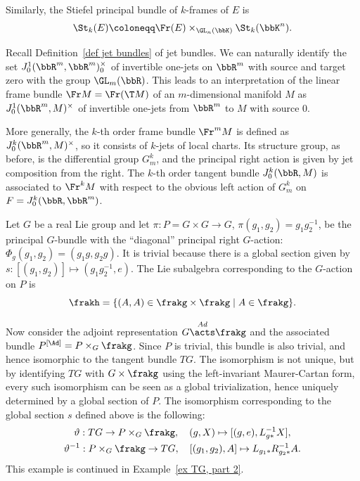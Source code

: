 \begin{example}
\begin{enumerate}
        Similarly, the Stiefel principal bundle of $k$-frames of $E$ is
        \[\St_k(E)\coloneqq \Fr(E)\times_{\GL_n(\bbK)}\St_k(\bbK^n).\]
    \end{enumerate}
\end{example}

\begin{example}
    Recall Definition~\ref{def jet bundles} of jet bundles. We can naturally identify the set $J^1_0(\bbR^m,\bbR^m)_0^\times$ of invertible one-jets on $\bbR^m$ with source and target zero with the group $\GL_m(\bbR)$. This leads to an interpretation of the linear frame bundle $\Fr M=\Fr(\T M)$ of an $m$-dimensional manifold $M$ as $J^1_0(\bbR^m,M)^\times$ of invertible one-jets from $\bbR^m$ to $M$ with source $0$.

    More generally, the $k$-th order frame bundle $\Fr^mM$ is defined as $J^k_0(\bbR^m,M)^\times$, so it consists of $k$-jets of local charts. Its structure group, as before, is the differential group $G^k_m$, and the principal right action is given by jet composition from the right. The $k$-th order tangent bundle $J^k_0(\bbR,M)$ is associated to $\Fr^k M$ with respect to the obvious left action of $G^k_m$ on $F=J^k_0(\bbR,\bbR^m)$.
\end{example}


\begin{example}\label{ex TG, part 1}
    Let $G$ be a real Lie group and let $\pi:P=G\times G\to G$, $\pi(g_1,g_2)=g_1g_2^{-1}$, be the principal $G$-bundle with the ``diagonal'' principal right $G$-action: $\Phi_g(g_1,g_2)=(g_1g,g_2g)$.  It is trivial because there is a global section given by $s:[(g_1,g_2)]\mapsto (g_1g_2^{-1},e)$. The Lie subalgebra corresponding to the $G$-action on $P$ is 
    \[\frakh=\{(A,A)\in \frakg\times\frakg\mid A\in\frakg\}.\]

    Now consider the adjoint representation $G\overset{Ad}{\acts}\frakg$ and the associated bundle $P^{[\Ad]}=P\times_G \frakg$. Since $P$ is trivial, this bundle is also trivial, and hence isomorphic to the tangent bundle $TG$. The isomorphism is not unique, but by identifying $TG$ with $G\times\frakg$ using the left-invariant Maurer-Cartan form, every such isomorphism can be seen as a global trivialization, hence uniquely determined by a global section of $P$. The isomorphism corresponding to the global section $s$ defined above is the following:
    \begin{gather}
    	\vartheta: TG\to P \times_G \frakg,\quad (g,X)\mapsto [(g,e),L_{g\ast}^{-1}X],\\
    	\vartheta^{-1}: P\times_G \frakg\to TG,\quad [(g_1,g_2),A]\mapsto L_{g_1\ast}R_{g_2\ast}^{-1}  A.
    \end{gather}
    This example is continued in Example~\ref{ex TG, part 2}.
\end{example}


